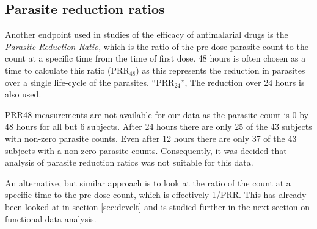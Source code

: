 



\subsection{Parasite reduction ratios}
Another endpoint used in studies of the efficacy of antimalarial drugs is the \emph{Parasite Reduction Ratio}, which is the ratio of the pre-dose parasite count to the count at a specific time from the time of first dose. 48 hours is often chosen as a time to calculate this ratio (PRR$_{48}$) as this represents the reduction in parasites over a single life-cycle of the parasites\cite{white}. ``PRR$_{24}$'', The reduction over 24 hours is also used\cite{newton}.

PRR48 measurements are not available for our data as the parasite count is 0 by 48 hours for all but 6 subjects. After 24 hours there are only 25 of the 43 subjects with non-zero parasite counts. Even after 12 hours there are only 37 of the 43 subjects with a non-zero parasite counts. Consequently, it was decided that analysis of parasite reduction ratios was not suitable for this data.

An alternative, but similar approach is to look at the ratio of the count at a specific time to the pre-dose count, which is effectively 1/PRR. This has already been looked at in section \ref{sec:develt} and is studied further in the next section on functional data analysis.

